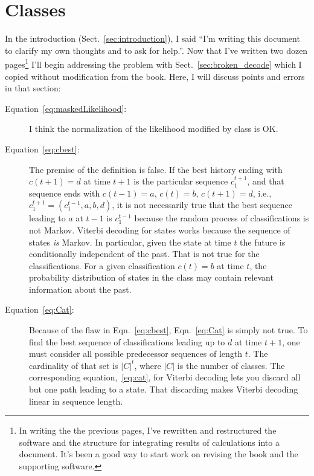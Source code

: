 \documentclass[]{article}
\newcommand{\ts}[3]{#1_{#2}^{#3}}                    %
\newcommand{\ti}[2]{{#1}{(#2)}}                  %
\newcommand{\ie}{i.e.\xspace}
\begin{document}
\section{Classes}\label{sec:classes}

In the introduction (Sect.~\ref{sec:introduction}), I said ``I'm
writing this document to clarify my own thoughts and to ask for
help.''.  Now that I've written two dozen pages\footnote{In writing
  the the previous pages, I've rewritten and restructured the software
  and the structure for integrating results of calculations into a
  document.  It's been a good way to start work on revising the book
  and the supporting software.} I'll begin addressing the problem with
Sect.~\ref{sec:broken_decode} which I copied without modification from
the book.  Here, I will discuss points and errors in that section:
\begin{description}
\item[Equation~\eqref{eq:maskedLikelihood}:] I think the normalization
  of the likelihood modified by class is OK.\@
\item[Equation~\eqref{eq:cbest}:] The premise of the definition is
  false.  If the best history ending with $\ti{c}{t+1}=d$ at time
  $t+1$ is the particular sequence $\ts{c}{1}{t+1}$, and that sequence
  ends with $\ti{c}{t-1}=a$, $\ti{c}{t}=b$, $\ti{c}{t+1}=d$, \ie,
  $\ts{c}{1}{t+1} = (\ts{c}{1}{t-1}, a, b, d)$, it is not necessarily
  true that the best sequence leading to $a$ at $t-1$ is
  $\ts{c}{1}{t-1}$ because the random process of classifications is
  not Markov.  Viterbi decoding for states works because the sequence
  of states \emph{is} Markov.  In particular, given the state at time
  $t$ the future is conditionally independent of the past.  That is
  not true for the classifications.  For a given classification
  $\ti{c}{t} = b$ at time $t$, the probability distribution of states
  in the class may contain relevant information about the past.
\item[Equation~\eqref{eq:Cat}:] Because of the flaw in
  Eqn.~\eqref{eq:cbest}, Eqn.~\eqref{eq:Cat} is simply not true.  To
  find the best sequence of classifications leading up to $d$ at time
  $t+1$, one must consider all possible predecessor sequences of
  length $t$.  The cardinality of that set is $\left|C\right|^t$,
  where $\left|C\right|$ is the number of classes.  The corresponding
  equation,~\eqref{eq:cat}, for Viterbi decoding lets you discard all
  but one path leading to a state.  That discarding makes Viterbi
  decoding linear in sequence length.
\end{description}
\end{document}
